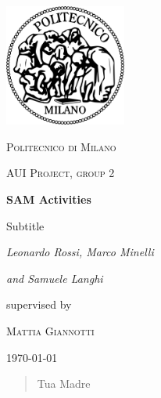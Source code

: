 \documentclass[11pt,a4paper,twoside,openright]{report}
\begin{document}
	
	
\begin{titlepage}
	\centering
	\includegraphics[width=0.30\textwidth]{images/logopm.png}\par\vspace{1cm}
	{\scshape\LARGE Politecnico di Milano \par}
	\vspace{1cm}
	{\scshape\Large AUI Project, group 2\par}
	\vspace{1.5cm}
	{\huge\bfseries SAM Activities\par}
	\vspace{0.3cm}
	{\Large Subtitle\par}
	
	\vspace{2cm}
	

	{\Large\itshape Leonardo Rossi, Marco Minelli\par}
	{\Large\itshape and Samuele Langhi}

	\vfill

	supervised by\par
	\textsc{Mattia Giannotti}
	
	\vfill
	
	{\Large \today\par}
	
	\newpage
	
	\begin{abstract}
		Tua Madre
	\end{abstract}
\end{titlepage}
	
	\tableofcontents
	
	
	
	
	
	
	
	
	
	
	
	\cleardoublepage
	
	
	
\end{document}
